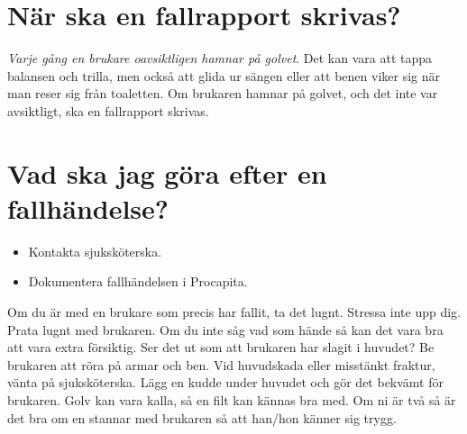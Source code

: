 \documentclass[paper=a5,DIV=15,headinclude,twoside=semi,openany,titlepage=firstiscover]{scrbook}
\begin{document}
\begin{titlepage}
\end{titlepage}

\mainmatter
\pagestyle{empty}

\section*{När ska en fallrapport skrivas?}
\textit{Varje gång en brukare oavsiktligen hamnar på golvet}. Det kan vara att tappa balansen och trilla, men också att glida ur sängen eller att benen viker sig när man reser sig från toaletten. Om brukaren hamnar på golvet, och det inte var avsiktligt, ska en fallrapport skrivas.

\section*{Vad ska jag göra efter en fallhändelse?}
\begin{itemize}
	\item Kontakta sjuksköterska.
	\item Dokumentera fallhändelsen i Procapita.
\end{itemize}
Om du är med en brukare som precis har fallit, ta det lugnt. Stressa inte upp dig. Prata lugnt med brukaren. Om du inte såg vad som hände så kan det vara bra att vara extra försiktig. Ser det ut som att brukaren har slagit i huvudet? Be brukaren att röra på armar och ben. Vid huvudskada eller misstänkt fraktur, vänta på sjuksköterska. Lägg en kudde under huvudet och gör det bekvämt för brukaren. Golv kan vara kalla, så en filt kan kännas bra med. Om ni är två så är det bra om en stannar med brukaren så att han/hon känner sig trygg.
\end{document}
